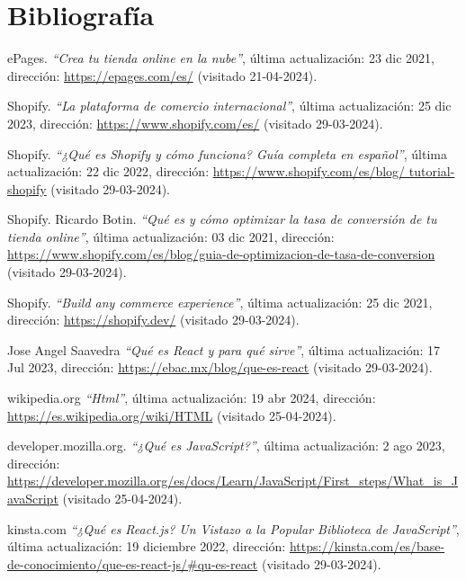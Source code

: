 \documentclass[12pt]{article}
\begin{document}
\clearpage
\section{Bibliografía}
\renewcommand{\refname}{}
\begin{thebibliography}{100} %
    
    ePages. 
    \textit{``Crea tu tienda online en la nube''}, última actualización: 23 dic 2021, dirección: \url{https://epages.com/es/} (visitado 21-04-2024).

    Shopify. 
    \textit{``La plataforma de comercio internacional''}, última actualización: 25 dic 2023, dirección: \url{https://www.shopify.com/es/} (visitado 29-03-2024).

    Shopify. 
    \textit{ ``¿Qué es Shopify y cómo funciona? Guía completa en español''},  última actualización: 22 dic 2022, dirección: \url{https://www.shopify.com/es/blog/
    tutorial-shopify} (visitado 29-03-2024).

    Shopify. Ricardo Botin. 
    \textit{``Qué es y cómo optimizar la tasa de conversión de tu tienda online''}, última actualización: 03 dic 2021, dirección: \url{https://www.shopify.com/es/blog/guia-de-optimizacion-de-tasa-de-conversion} (visitado 29-03-2024).

    Shopify. 
    \textit{``Build any commerce experience''}, última actualización: 25 dic 2021, dirección: \url{https://shopify.dev/} (visitado 29-03-2024).

    Jose Angel Saavedra
    \textit{``Qué es React y para qué sirve''}, última actualización: 17 Jul 2023, dirección: \url{https://ebac.mx/blog/que-es-react} (visitado 29-03-2024).

    wikipedia.org
    \textit{``Html''}, última actualización: 19 abr 2024, dirección: \url{https://es.wikipedia.org/wiki/HTML} (visitado 25-04-2024).

    developer.mozilla.org.
    \textit{``¿Qué es JavaScript?''}, última actualización: 2 ago 2023, dirección: \url{https://developer.mozilla.org/es/docs/Learn/JavaScript/First_steps/What_is_JavaScript} (visitado 25-04-2024).

    kinsta.com
    \textit{``¿Qué es React.js? Un Vistazo a la Popular Biblioteca de JavaScript''}, última actualización: 19 diciembre 2022, dirección: \url{https://kinsta.com/es/base-de-conocimiento/que-es-react-js/#qu-es-react} (visitado 29-03-2024).


\end{thebibliography}
\end{document}
